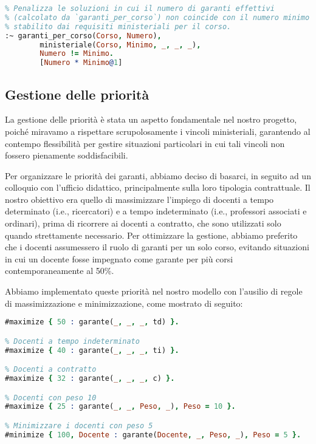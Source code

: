 \begin{lstlisting}[language=prolog, caption=Minimizzazione dei garanti per corso di laurea.]
% Vincolo debole per minimizzare il numero di garanti effettivi rispetto al minimo richiesto.
% Penalizza le soluzioni in cui il numero di garanti effettivi
% (calcolato da `garanti_per_corso`) non coincide con il numero minimo
% stabilito dai requisiti ministeriali per il corso.
:~ garanti_per_corso(Corso, Numero),
        ministeriale(Corso, Minimo, _, _, _),
        Numero != Minimo.
        [Numero * Minimo@1]
\end{lstlisting}


\subsection{Gestione delle priorità}\label{sec:priorita}
La gestione delle priorità è stata un aspetto fondamentale nel nostro progetto, poiché 
miravamo a rispettare scrupolosamente i vincoli ministeriali, garantendo al contempo 
flessibilità per gestire situazioni particolari in cui tali vincoli non fossero 
pienamente soddisfacibili.

Per organizzare le priorità dei garanti, abbiamo deciso di basarci, in seguito ad un 
colloquio con l'ufficio didattico, principalmente sulla loro tipologia contrattuale. 
Il nostro obiettivo era quello di massimizzare l'impiego di docenti a tempo determinato 
(i.e., ricercatori) e a tempo indeterminato (i.e., professori associati e ordinari), prima 
di ricorrere ai docenti a contratto, che sono utilizzati solo quando strettamente necessario. 
Per ottimizzare la gestione, abbiamo preferito che i docenti assumessero il ruolo di 
garanti per un solo corso, evitando situazioni in cui un docente fosse impegnato come 
garante per più corsi contemporaneamente al 50\%.

Abbiamo implementato queste priorità nel nostro modello con l'ausilio di regole di 
massimizzazione e minimizzazione, come mostrato di seguito:

\begin{lstlisting}[language=prolog, caption=Gestione delle priorità dei docenti.]
% Docenti a tempo determinato (ricercatori)
#maximize { 50 : garante(_, _, _, td) }.

% Docenti a tempo indeterminato
#maximize { 40 : garante(_, _, _, ti) }.

% Docenti a contratto
#maximize { 32 : garante(_, _, _, c) }.

% Docenti con peso 10
#maximize { 25 : garante(_, _, Peso, _), Peso = 10 }.

% Minimizzare i docenti con peso 5
#minimize { 100, Docente : garante(Docente, _, Peso, _), Peso = 5 }.
\end{lstlisting}

